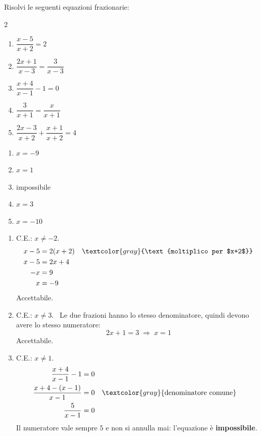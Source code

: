 \begin{question}[ID=3.4, subtitle={Equazioni frazionarie}, difficulty=media, tags={equazioni frazionarie}]
Risolvi le seguenti equazioni frazionarie:
\begin{multicols}{2}
\begin{enumerate}[leftmargin=3cm]
    \item $\dfrac{x-5}{x+2} = 2$
    \item $\dfrac{2x+1}{x-3} = \dfrac{3}{x-3}$
    \item $\dfrac{x+4}{x-1} - 1 = 0$
    \item $\dfrac{3}{x+1} = \dfrac{x}{x+1}$
    \item $\dfrac{2x-3}{x+2} + \dfrac{x+1}{x+2} = 4$
\end{enumerate}
\end{multicols}
\begin{solution}
\begin{enumerate}
    \item $x=-9$
    \item $x=1$
    \item impossibile
    \item $x=3$
    \item $x=-10$
\end{enumerate}
\end{solution}
\begin{explanation}
\begin{enumerate}
    \item C.E.: $x\neq-2$.
    \[\begin{aligned}
    x-5 &= 2(x+2) && \textcolor{gray}{\text{moltiplico per $x+2$}}\\
    x-5 &= 2x+4\\
    -x &= 9\\
    x &= -9
    \end{aligned}\]
    Accettabile.
    \item C.E.: $x\neq3$. \ Le due frazioni hanno lo stesso denominatore, quindi devono avere lo stesso numeratore:
    \[ 2x+1=3 \;\Rightarrow\; x=1 \]
    Accettabile.
    \item C.E.: $x\neq1$.
    \[\begin{aligned}
    \dfrac{x+4}{x-1}-1 &= 0\\
    \dfrac{x+4-(x-1)}{x-1} &= 0 && \textcolor{gray}{\text{denominatore comune}}\\
    \dfrac{5}{x-1} &= 0
    \end{aligned}\]
    Il numeratore vale sempre $5$ e non si annulla mai: l'equazione è \textbf{impossibile}.

\end{enumerate}
\end{explanation}
\end{question}
